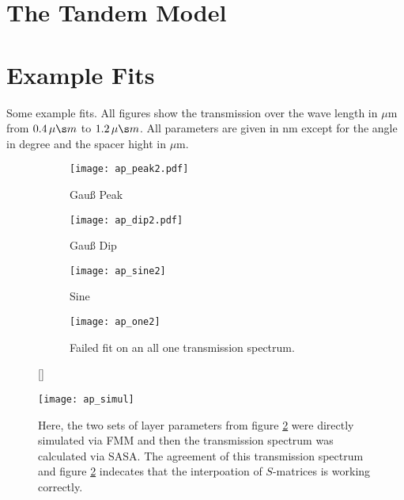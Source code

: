 \appendix
\section{The Tandem Model}\label{sec:apdx_A}




\newpage

\section{Example Fits}\label{sec:apdx_B}
Some example fits. All figures show the transmission over the wave length in $\mu$m from $0.4\, \mu \s m$ to $1.2\, \mu \s m$.
All parameters are given in nm except for the angle in degree and the spacer hight in $\mu$m.
\begin{figure}[H]
\centering
\begin{subfigure}{.5\textwidth}
    \centering
    \texttt{[image: ap\_peak2.pdf]}
    \caption{Gauß Peak}
    \label{gauspeak}
\end{subfigure}%
\begin{subfigure}{.5\textwidth}
    \centering
    \texttt{[image: ap\_dip2.pdf]}
    \caption{Gauß Dip}
    \label{gausdip}
\end{subfigure}
\caption{}
\label{}
\end{figure}


\begin{figure}[H]
\centering
\begin{subfigure}{.5\textwidth}
    \centering
    \texttt{[image: ap\_sine2]}
    \caption{Sine}
    \label{}
\end{subfigure}%
\begin{subfigure}{.5\textwidth}
    \centering
    \texttt{[image: ap\_one2]}
    \caption{Failed fit on an all one transmission spectrum.}
    \label{one}
\end{subfigure}
\caption{}
\label{}
\end{figure}

\begin{figure}[H]
    [\FBwidth]
    {\caption{
        Here, the two sets of layer parameters from figure \ref{gausdip} were directly simulated via FMM and then the transmission spectrum was calculated via SASA. The agreement of this transmission spectrum and figure \ref{gausdip} indecates that the interpoation of $S$-matrices is working correctly.
    }
    \label{fig:in:avg_plot}}
    {\texttt{[image: ap\_simul]}}
\end{figure}